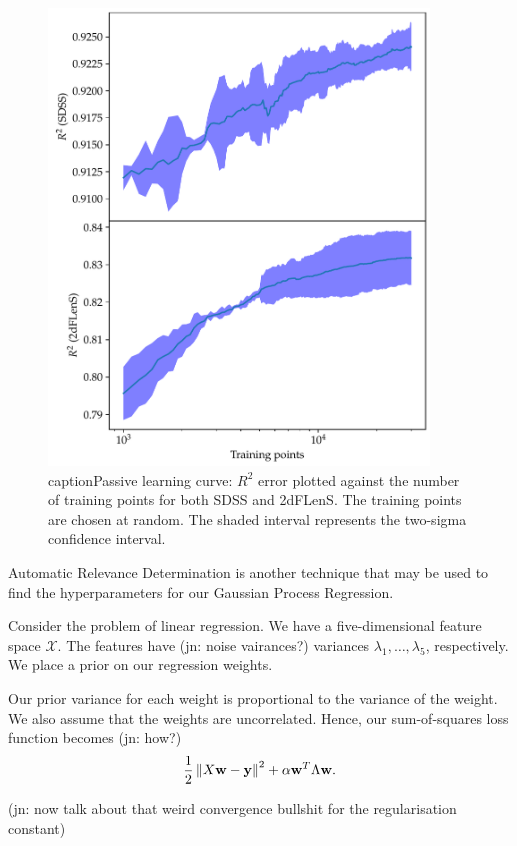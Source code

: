 \documentclass[11pt,twoside,openright]{report}
\newcommand\bw{\mathbf{w}}
\newcommand\by{\mathbf{y}}
\newcommand\cX{\mathcal{X}}
\newcommand\norm[1]{\left\|#1\right\|}
\newcommand\jn[1]{{\color{red}(jn: #1)}}
\begin{document}
  \begin{figure}
    \centering
    \includegraphics[width=0.9\textwidth]{passive_r2.pdf}
    caption{Passive learning curve: $R^2$ error plotted against the number of training points for both SDSS and 2dFLenS. The training points are chosen at random. The shaded interval represents the two-sigma confidence interval.}
    \label{fig:passive_r2}
  \end{figure}

Automatic Relevance Determination is another technique that may be used to find the hyperparameters for our Gaussian Process Regression.

Consider the problem of linear regression. We have a five-dimensional feature space $\cX$. The features have \jn{noise vairances?} variances $\lambda_1, \dots, \lambda_5$, respectively. We place a prior on our regression weights.

Our prior variance for each weight is proportional to the variance of the weight. We also assume that the weights are uncorrelated. Hence, our sum-of-squares loss function becomes \jn{how?}\[
    \frac12\norm{X\bw - \by}^2 + \alpha \bw^T \Lambda \bw \text.
\]

\jn{now talk about that weird convergence bullshit for the regularisation constant}
\end{document}

